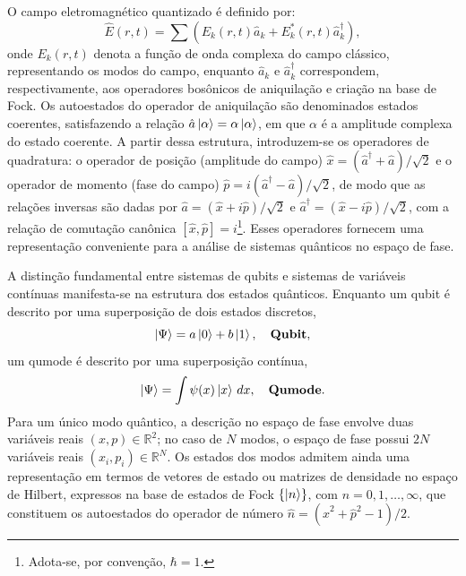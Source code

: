 O campo eletromagnético quantizado é definido por:
\begin{equation}
    \hat{E}(r,t) = \sum \left( E_k(r,t)\hat{a}_k + E_k^{*}(r,t)\hat{a}_k^{\dagger} \right),
\end{equation}
onde $E_k(r,t)$ denota a função de onda complexa do campo clássico, representando os modos do campo, enquanto $\hat{a}_k$ e $\hat{a}^{\dagger}_k$ correspondem, respectivamente, aos operadores bosônicos de aniquilação e criação na base de Fock. Os autoestados do operador de aniquilação são denominados estados coerentes, satisfazendo a relação $\hat{a}\ket{\alpha} = \alpha \ket{\alpha}$, em que $\alpha$ é a amplitude complexa do estado coerente. A partir dessa estrutura, introduzem-se os operadores de quadratura: o operador de posição (amplitude do campo) $\hat{x} = (\hat{a}^{\dagger} + \hat{a})/\sqrt{2}$ e o operador de momento (fase do campo) $\hat{p} = i(\hat{a}^{\dagger} - \hat{a})/\sqrt{2}$, de modo que as relações inversas são dadas por $\hat{a} = (\hat{x} + i\hat{p})/\sqrt{2}$ e $\hat{a}^{\dagger} = (\hat{x} - i\hat{p})/\sqrt{2}$, com a relação de comutação canônica $[\hat{x},\hat{p}] = i$\footnote{Adota-se, por convenção, $\hbar = 1$.}. Esses operadores fornecem uma representação conveniente para a análise de sistemas quânticos no espaço de fase.

A distinção fundamental entre sistemas de qubits e sistemas de variáveis contínuas manifesta-se na estrutura dos estados quânticos. Enquanto um qubit é descrito por uma superposição de dois estados discretos,
\begin{equation*}
    \ket{\Psi} = a\ket{0} + b\ket{1}, \quad \textbf{Qubit},
\end{equation*}
um qumode é descrito por uma superposição contínua,
\begin{equation*}
    \ket{\Psi} = \int \psi(x)\ket{x}\, dx, \quad \textbf{Qumode}.
\end{equation*}
Para um único modo quântico, a descrição no espaço de fase envolve duas variáveis reais $(x, p) \in \mathbb{R}^{2}$; no caso de $N$ modos, o espaço de fase possui $2N$ variáveis reais $(x_i, p_i) \in \mathbb{R}^{N}$. Os estados dos modos admitem ainda uma representação em termos de vetores de estado ou matrizes de densidade no espaço de Hilbert, expressos na base de estados de Fock $\{\ket{n}\}$, com $n = 0, 1, \ldots, \infty$, que constituem os autoestados do operador de número $\hat{n} = (\hat{x}^2 + \hat{p}^2 - 1)/2$.

